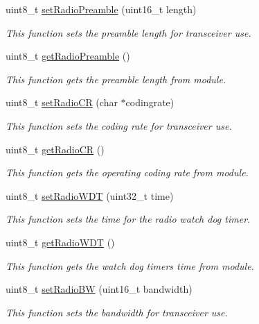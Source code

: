 \begin{DoxyCompactItemize}
uint8\+\_\+t \hyperlink{class_wasp_lo_ra_w_a_n_a4987a72e6dd6322e3abcd000783022cf}{set\+Radio\+Preamble} (uint16\+\_\+t length)
\begin{DoxyCompactList}\small\item\em This function sets the preamble length for transceiver use. \end{DoxyCompactList}\item 
uint8\+\_\+t \hyperlink{class_wasp_lo_ra_w_a_n_a8f1e1fb190423d377204fb3e0243edeb}{get\+Radio\+Preamble} ()
\begin{DoxyCompactList}\small\item\em This function gets the preamble length from module. \end{DoxyCompactList}\item 
uint8\+\_\+t \hyperlink{class_wasp_lo_ra_w_a_n_ad2b1277646c9989a86eb56fd28f08e3a}{set\+Radio\+CR} (char $\ast$codingrate)
\begin{DoxyCompactList}\small\item\em This function sets the coding rate for transceiver use. \end{DoxyCompactList}\item 
uint8\+\_\+t \hyperlink{class_wasp_lo_ra_w_a_n_a95238b0b809cd302767b814d1c311112}{get\+Radio\+CR} ()
\begin{DoxyCompactList}\small\item\em This function gets the operating coding rate from module. \end{DoxyCompactList}\item 
uint8\+\_\+t \hyperlink{class_wasp_lo_ra_w_a_n_a89531d205fabd7f2e72c4b6240627f5e}{set\+Radio\+W\+DT} (uint32\+\_\+t time)
\begin{DoxyCompactList}\small\item\em This function sets the time for the radio watch dog timer. \end{DoxyCompactList}\item 
uint8\+\_\+t \hyperlink{class_wasp_lo_ra_w_a_n_a011452f8b75f6a6571a43fd0290b7e4a}{get\+Radio\+W\+DT} ()
\begin{DoxyCompactList}\small\item\em This function gets the watch dog timer\textquotesingle{}s time from module. \end{DoxyCompactList}\item 
uint8\+\_\+t \hyperlink{class_wasp_lo_ra_w_a_n_a2ac8547e494a7f032a78e773664bdb3b}{set\+Radio\+BW} (uint16\+\_\+t bandwidth)
\begin{DoxyCompactList}\small\item\em This function sets the bandwidth for transceiver use. \end{DoxyCompactList}\item 

\end{DoxyCompactItemize}
